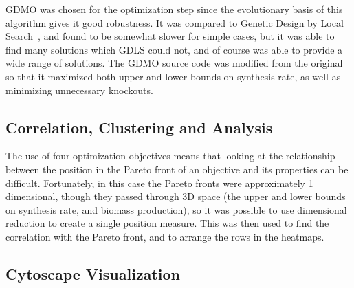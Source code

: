 \documentclass[a4paper,twocolumn]{article}
\begin{document}
GDMO was chosen for the optimization step since the evolutionary basis of this algorithm gives it good robustness. It was compared to Genetic Design by Local Search~\cite{Lun2009}, and found to be somewhat slower for simple cases, but it was able to find many solutions which GDLS could not, and of course was able to provide a wide range of solutions. The GDMO source code was modified from the original so that it maximized both upper and lower bounds on synthesis rate, as well as minimizing unnecessary knockouts.

\subsection{Correlation, Clustering and Analysis}
The use of four optimization objectives means that looking at the relationship between the position in the Pareto front of an objective and its properties can be difficult. Fortunately, in this case the Pareto fronts were approximately 1 dimensional, though they passed through 3D space (the upper and lower bounds on synthesis rate, and biomass production), so it was possible to use dimensional reduction to create a single position measure. This was then used to find the correlation with the Pareto front, and to arrange the rows in the heatmaps.

\subsection{Cytoscape Visualization}




\nocite{R-base,R-ggplot2,R-RCytoscape}



\end{document}
